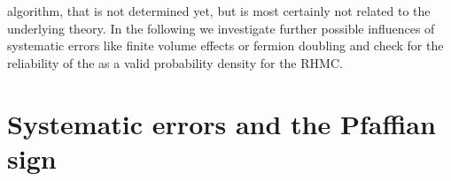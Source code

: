 algorithm, that is not determined yet, but is most certainly not related to the underlying theory. In the following we investigate further possible influences of systematic errors like finite volume effects or fermion doubling and check for the reliability of the  as a valid probability density for the RHMC.
%
%
%
%
%
%
%
%
%
%
%
%
\section{Systematic errors and the Pfaffian sign}\label{sec: sys_errors}
%
